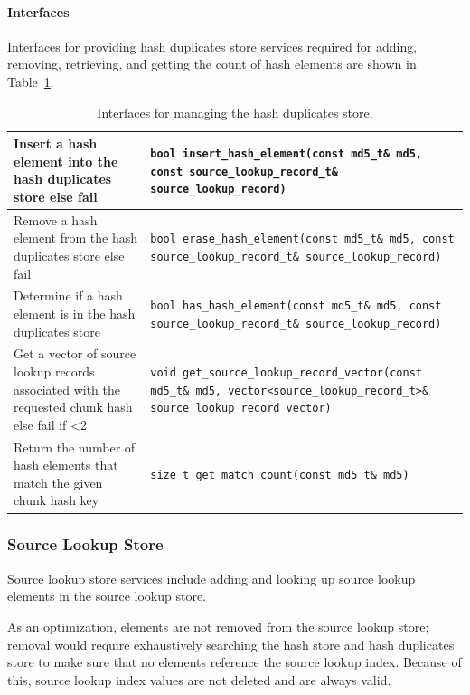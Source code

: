 \documentclass[12pt,twoside]{article}
\begin{document}
\paragraph{Interfaces}
Interfaces for providing hash duplicates store services required for 
adding, removing, retrieving, and getting the count of hash elements
are shown in Table~\ref{hash-duplicates-store-interfaces}.

\begin{table}[h]
\center
\begin{tabular}{|p{2in}|p{4in}|}
\hline
Insert a hash element into the hash duplicates store else fail & \texttt{bool insert\_hash\_element(const md5\_t\& md5, const source\_lookup\_record\_t\& source\_lookup\_record)} \\
\hline
Remove a hash element from the hash duplicates store else fail & \texttt{bool erase\_hash\_element(const md5\_t\& md5, const source\_lookup\_record\_t\& source\_lookup\_record)} \\
\hline
Determine if a hash element is in the hash duplicates store & \texttt{bool has\_hash\_element(const md5\_t\& md5, const source\_lookup\_record\_t\& source\_lookup\_record)} \\
\hline
Get a vector of source lookup records associated with the requested chunk hash else fail if \textless 2 & \texttt{void get\_source\_lookup\_record\_vector(const md5\_t\& md5, vector<source\_lookup\_record\_t>\& source\_lookup\_record\_vector)} \\
\hline
Return the number of hash elements that match the given chunk hash key & \texttt{size\_t get\_match\_count(const md5\_t\& md5)} \\
\hline
\end{tabular}
\caption{Interfaces for managing the hash duplicates store.\label{hash-duplicates-store-interfaces}}
\end{table}

\subsubsection{Source Lookup Store}
Source lookup store services include adding
and looking up source lookup elements in the source lookup store.

As an optimization, elements are not removed from the source lookup store;
removal would require exhaustively searching the hash store and hash duplicates store
to make sure that no elements reference the source lookup index.
Because of this, source lookup index values are not deleted
and are always valid.
\end{document}
